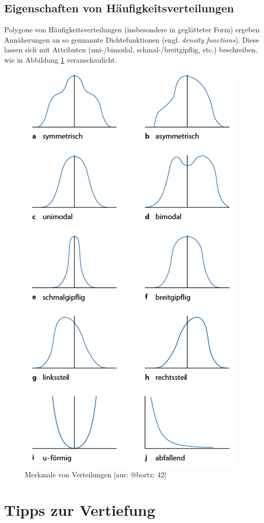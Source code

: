 \documentclass[
  11pt,
  ngerman,
  a4paper,
]{report}
\begin{document}
\hypertarget{eigenschaften-von-huxe4ufigkeitsverteilungen}{%
\subsection{Eigenschaften von Häufigkeitsverteilungen}\label{eigenschaften-von-huxe4ufigkeitsverteilungen}}

Polygone von Häufigkeitsverteilungen (insbesondere in geglätteter Form) ergeben Annäherungen an so gennannte Dichtefunktionen (engl. \emph{density functions}). Diese lassen sich mit Attributen (uni-/bimodal, schmal-/breitgipflig, etc.) beschreiben, wie in Abbildung \ref{fig:shapes} veranschaulicht.

\begin{figure}[!h]

{\centering \includegraphics[width=.6\linewidth]{img/shapes} 

}

\caption{Merkmale von Verteilungen [aus: @bortz: 42]}\label{fig:shapes}
\end{figure}

\hypertarget{tipps-zur-vertiefung}{%
\section*{Tipps zur Vertiefung}\label{tipps-zur-vertiefung}}
\end{document}

